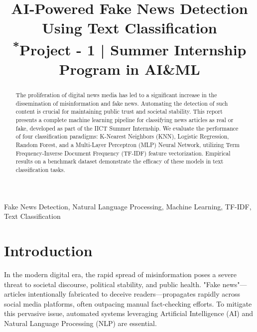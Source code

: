 \documentclass[conference]{IEEEtran}
\begin{document}
\title{AI-Powered Fake News Detection Using Text Classification\\
{\footnotesize \textsuperscript{*}Project - 1 | Summer Internship Program in AI\&ML}
}

\author{
}

\maketitle

\begin{abstract}
The proliferation of digital news media has led to a significant increase in the dissemination of misinformation and fake news. Automating the detection of such content is crucial for maintaining public trust and societal stability. This report presents a complete machine learning pipeline for classifying news articles as real or fake, developed as part of the IICT Summer Internship. We evaluate the performance of four classification paradigms: K-Nearest Neighbors (KNN), Logistic Regression, Random Forest, and a Multi-Layer Perceptron (MLP) Neural Network, utilizing Term Frequency-Inverse Document Frequency (TF-IDF) feature vectorization. Empirical results on a benchmark dataset demonstrate the efficacy of these models in text classification tasks.
\end{abstract}

\begin{IEEEkeywords}
Fake News Detection, Natural Language Processing, Machine Learning, TF-IDF, Text Classification
\end{IEEEkeywords}

\section{Introduction}
In the modern digital era, the rapid spread of misinformation poses a severe threat to societal discourse, political stability, and public health. "Fake news"---articles intentionally fabricated to deceive readers---propagates rapidly across social media platforms, often outpacing manual fact-checking efforts. To mitigate this pervasive issue, automated systems leveraging Artificial Intelligence (AI) and Natural Language Processing (NLP) are essential. 
\end{document}
